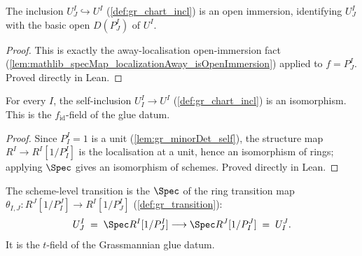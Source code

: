 \begin{lemma}\leanok
  \label{lem:gr_chartIncl_isOpenImmersion}
  The inclusion \(U^I_J \hookrightarrow U^I\) (\cref{def:gr_chart_incl}) is an
  open immersion, identifying \(U^I_J\) with the basic open \(D(P^I_J)\) of
  \(U^I\).
\end{lemma}
\begin{proof}
  \leanok
  This is exactly the away-localisation open-immersion fact
  (\cref{lem:mathlib_specMap_localizationAway_isOpenImmersion}) applied to
  \(f = P^I_J\). Proved directly in Lean.
\end{proof}

\begin{lemma}\leanok
  \label{lem:gr_chartIncl_self_isIso}
  For every \(I\), the self-inclusion \(U^I_I \to U^I\) (\cref{def:gr_chart_incl})
  is an isomorphism. This is the \(f_{\mathrm{id}}\)-field of the glue datum.
\end{lemma}
\begin{proof}
  \leanok
  Since \(P^I_I = 1\) is a unit (\cref{lem:gr_minorDet_self}), the structure map
  \(R^I \to R^I[1/P^I_I]\) is the localisation at a unit, hence an isomorphism of
  rings; applying \(\Spec\) gives an isomorphism of schemes. Proved directly in
  Lean.
\end{proof}

\begin{definition}\leanok
  \label{def:gr_chart_transition}
  The scheme-level transition is the \(\Spec\) of the ring transition map
  \(\theta_{I,J} : R^J[1/P^J_I] \to R^I[1/P^I_J]\) (\cref{def:gr_transition}):
  \[
    U^I_J \;=\; \Spec R^I[1/P^I_J] \longrightarrow \Spec R^J[1/P^J_I] \;=\; U^J_I .
  \]
  It is the \(t\)-field of the Grassmannian glue datum.
\end{definition}

